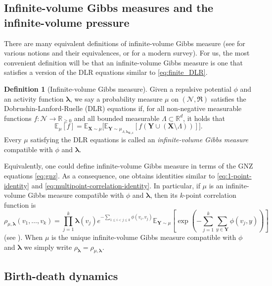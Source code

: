 \documentclass[10pt]{amsart}
\theoremstyle{definition}
\newtheorem{definition}[theorem]{Definition}
\theoremstyle{remark}
\newcommand{\pointsets}{\mathcal{N}}
\newcommand{\events}{\mathfrak{R}}
\newcommand{\bX}{\mathbf{X}}
\newcommand{\bY}{\mathbf{Y}}
\newcommand{\blambda}{{\boldsymbol{\lambda}}}
\newcommand{\E}{\mathbb{E}}
\newcommand{\R}{\mathbb{R}}
\newcommand{\region}{\Lambda}
\newcommand{\potential}{\phi}
\newcommand{\activities}{\pmb{\lambda}}
\begin{document}
	\subsection{Infinite-volume Gibbs measures and the infinite-volume pressure}
	
	There are many equivalent definitions of infinite-volume Gibbs measure (see \cite{ruelle1969statistical} for various notions and their equivalences, or \cite{jansen2018gibbsian} for a modern survey).  For us, the most convenient definition will be that an infinite-volume Gibbs measure is one that satisfies a version of the DLR equations similar to \eqref{eq:finite_DLR}.
	
	\begin{definition}[Infinite-volume Gibbs measure]\label{def:dlr}
		Given a repulsive potential $\potential$ and an activity function $\activities$, we say a probability measure $\mu$ on $(\pointsets, \events)$ satisfies the Dobrushin-Lanford-Ruelle (DLR) equations if, for all non-negative measurable functions $f: \pointsets \to \R_{\ge 0}$ and all bounded measurable $\region \subset \R^d$, it holds that
		\[
		\E_{\mu}[f] = \E_{\bX \sim \mu}\big[ \E_{\bY \sim \mu_{\region, \activities_{\bX \setminus \region}}}[f(\bY \cup (\bX \setminus \region))]\big].
		\]
		Every $\mu$ satisfying the DLR equations is called an \emph{infinite-volume Gibbs measure} compatible with $\potential$ and $\activities$.
	\end{definition}
	
	Equivalently, one could define infinite-volume Gibbs measure in terms of the GNZ equations \eqref{eq:gnz}.  As a consequence, one obtains identities similar to \eqref{eq:1-point-identity} and \eqref{eq:multipoint-correlation-identity}.  In particular, if $\mu$ is an infinite-volume Gibbs measure compatible with $\phi$ and $\blambda$, then its $k$-point correlation function is
	\begin{equation}\label{eq:k-pt-correlation-definition}
		\rho_{\mu,\blambda}(v_1,\ldots,v_k) = \prod_{j = 1}^k \blambda(v_j)  e^{- \sum_{1 \leq i < j \leq k} \phi(v_i,v_j)} \E_{\bY \sim \mu} \left[\exp\left(- \sum_{j = 1}^k \sum_{y \in \bY} \phi(v_j,y) \right) \right]
	\end{equation}
	(see \cite[Prop.~5.12]{jansen2018gibbsian}).  When $\mu$ is the unique infinite-volume Gibbs measure compatible with $\phi$ and $\blambda$ we simply write $\rho_{\blambda} = \rho_{\mu,\blambda}$.
	
	
	
	
	\subsection{Birth-death dynamics}\label{sec:birth-death-dynamics}
	
\end{document}
